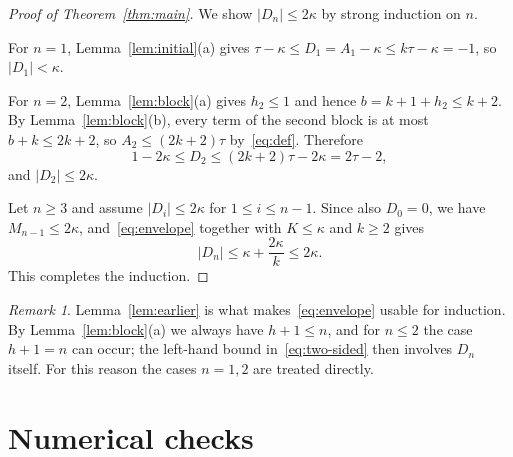 \documentclass{amsart}
\theoremstyle{definition}
\theoremstyle{remark}
\newtheorem{remark}[theorem]{Remark}
\numberwithin{equation}{section}
\numberwithin{table}{section}
\begin{document}
\begin{proof}[Proof of Theorem~\ref{thm:main}]
We show $\lvert D_n\rvert\le2\kappa$ by strong induction on $n$.

For $n=1$, Lemma~\ref{lem:initial}(a) gives $\tau-\kappa\le D_1=A_1-\kappa\le k\tau-\kappa=-1$, so $\lvert D_1\rvert<\kappa$.

For $n=2$, Lemma~\ref{lem:block}(a) gives $h_2\le1$ and hence $b=k+1+h_2\le k+2$. By Lemma~\ref{lem:block}(b), every term of the second block is at most $b+k\le2k+2$, so $A_2\le(2k+2)\tau$ by~\eqref{eq:def}. Therefore
\[
1-2\kappa\le D_2\le(2k+2)\tau-2\kappa=2\tau-2,
\]
and $\lvert D_2\rvert\le2\kappa$.

Let $n\ge3$ and assume $\lvert D_i\rvert\le2\kappa$ for $1\le i\le n-1$. Since also $D_0=0$, we have $M_{n-1}\le2\kappa$, and~\eqref{eq:envelope} together with $K\le\kappa$ and $k\ge2$ gives
\[
\lvert D_n\rvert\le\kappa+\frac{2\kappa}{k}\le2\kappa.
\]
This completes the induction.
\end{proof}

\begin{remark}
Lemma~\ref{lem:earlier} is what makes~\eqref{eq:envelope} usable for induction. By Lemma~\ref{lem:block}(a) we always have $h+1\le n$, and for $n\le2$ the case $h+1=n$ can occur; the left-hand bound in~\eqref{eq:two-sided} then involves $D_n$ itself. For this reason the cases $n=1,2$ are treated directly.
\end{remark}

\section{Numerical checks}\label{sec:numerics}
\end{document}
